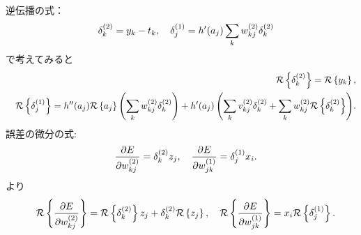 逆伝播の式：
\begin{eqnarray*}&&
\deltak = y_k-t_k,\hseq
\deltaj = h'(a_j)\sum_k\ww{kj}{2}\deltak
\end{eqnarray*}
で考えてみると
\begin{eqnarray*}&&
\calRR{\deltak}=\calRR{y_k},
\\&&
\calRR{\deltaj}
 = h''(a_j)\calRR{a_j} \left( \sum_k \ww{kj}{2}\deltak \right)
   + h'(a_j)\left(
       \sum_k v_{kj}^{(2)} \deltak + \sum_k \ww{kj}{2} \calRR{\deltak}
     \right)\!.
\end{eqnarray*}
誤差の微分の式:
\begin{eqnarray*}&&
\diff{\ww{kj}{2}}{E} = \deltak z_j,\hseq
\diff{\ww{jk}{1}}{E} = \deltaj x_i.
\end{eqnarray*}
より
\begin{eqnarray*}&&
\calRR{\diff{\ww{kj}{2}}{E}} = \calRR{\deltak}z_j+\deltak \calRR{z_j},\hseq
\calRR{\diff{\ww{jk}{1}}{E}} = x_i\calRR{\deltaj}.
\end{eqnarray*}
\vspace{0pt}

